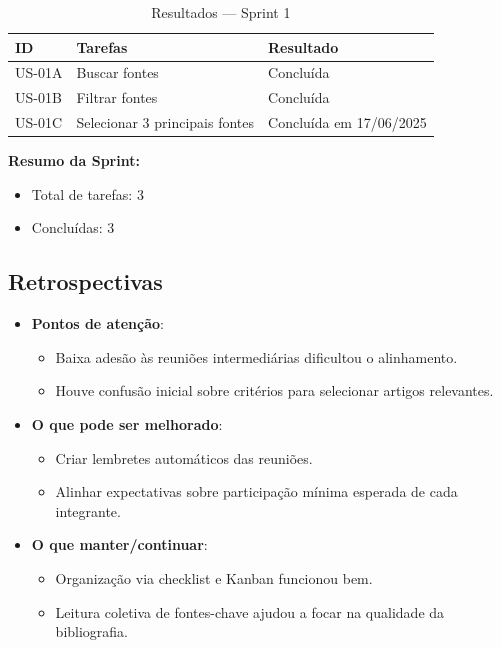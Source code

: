 \begin{table}[htbp]
  \centering
  \caption{Resultados — Sprint 1}
  \label{tab:resultSprint1}
  \begin{tabular}{lll}
    \toprule
    ID & Tarefas & Resultado \\
    \midrule
    US-01A & Buscar fontes & Concluída \\
    US-01B & Filtrar fontes & Concluída \\
    US-01C & Selecionar 3 principais fontes & Concluída em 17/06/2025 \\
    \bottomrule
  \end{tabular}
\end{table}

\vspace{1em}
\noindent\textbf{Resumo da Sprint:}
\begin{itemize}[noitemsep]
  \item Total de tarefas: 3
  \item Concluídas: 3
\end{itemize}

\subsection{Retrospectivas}

\begin{itemize}
  \item \textbf{Pontos de atenção}:
  \begin{itemize}
    \item Baixa adesão às reuniões intermediárias dificultou o alinhamento.
    \item Houve confusão inicial sobre critérios para selecionar artigos relevantes.
  \end{itemize}

  \item \textbf{O que pode ser melhorado}:
  \begin{itemize}
    \item Criar lembretes automáticos das reuniões.
    \item Alinhar expectativas sobre participação mínima esperada de cada integrante.
  \end{itemize}

  \item \textbf{O que manter/continuar}:
  \begin{itemize}
    \item Organização via checklist e Kanban funcionou bem.
    \item Leitura coletiva de fontes-chave ajudou a focar na qualidade da bibliografia.
  \end{itemize}
\end{itemize}

